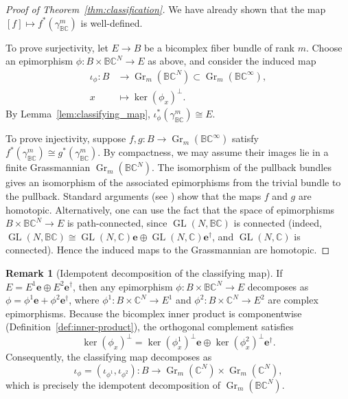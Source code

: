 \documentclass[11pt]{amsart}
\newcommand{\BC}{\mathbb{BC}}       %
\newcommand{\C}{\mathbb{C}}          %
\newcommand{\e}{\mathbf{e}}          %
\newcommand{\ed}{\mathbf{e}^\dagger} %
\newcommand{\GL}{\operatorname{GL}}  %
\newcommand{\Gr}{\operatorname{Gr}}
\theoremstyle{definition}
\newtheorem{remark}[prop]{Remark}            %
\begin{document}
\begin{proof}[Proof of Theorem~\ref{thm:classification}]
    We have already shown that the map $[f] \mapsto f^*(\gamma_{\BC}^m)$ is well-defined.

To prove surjectivity, let $E\to B$ be a bicomplex fiber bundle of rank $m$. Choose an
epimorphism $\phi:B\times\BC^N\to E$ as above, and consider the induced map
\begin{align*}
\iota_{\phi}:B&\to\Gr_m(\BC^{N})
\subset\Gr_m(\BC^{\infty}),\\
x&\mapsto\ker(\phi_{x})^{\perp}.
\end{align*}
By Lemma~\ref{lem:classifying_map}, $\iota_{\phi}^{*}(\gamma_{\mathbb{B}\mathbb{C}}^{m})\cong E$.

To prove injectivity, suppose $f, g: B \to \Gr_m(\BC^\infty)$ satisfy $f^*(\gamma_{\BC}^m) \cong g^*(\gamma_{\BC}^m)$. By compactness, we may assume their images lie in a finite Grassmannian $\Gr_m(\BC^N)$. The isomorphism of the pullback bundles gives an isomorphism of the associated epimorphisms from the trivial bundle to the pullback. Standard arguments (see \cite[Theorem~1.4.15]{Ati1967}) show that the maps $f$ and $g$ are homotopic. Alternatively, one can use the fact that the space of epimorphisms $B \times \BC^N \to E$ is path-connected, since $\GL(N,\BC)$ is connected (indeed, $\GL(N,\BC) \cong \GL(N,\C)\e \oplus \GL(N,\C)\ed$, and $\GL(N,\C)$ is connected). Hence the induced maps to the Grassmannian are homotopic.
\end{proof}

\begin{remark}[Idempotent decomposition of the classifying map]
If $E=E^{1}\e\oplus E^{2}\ed$, then any epimorphism
$\phi:B\times\BC^{N}\to E$ decomposes as
$\phi=\phi^{1}\e+\phi^{2}\ed$, where
$\phi^{1}:B\times\C^{N}\to E^{1}$ and
$\phi^{2}:B\times\C^{N}\to E^{2}$ are complex epimorphisms.
Because the bicomplex inner product is componentwise
(Definition~\textup{\ref{def:inner-product}}), the orthogonal complement
satisfies
\begin{equation*}
\ker(\phi_{x})^{\perp}
=\ker(\phi^{1}_{x})^{\perp}\mathbf{e}\oplus\ker(\phi^{2}_{x})^{\perp}\mathbf{e}^{\dagger}.
\end{equation*}
Consequently, the classifying map decomposes as
\begin{equation*}
\iota_{\phi}
=(\iota_{\phi^{1}},\iota_{\phi^{2}})
:B\to\operatorname{Gr}_{m}(\mathbb{C}^{N})\times\operatorname{Gr}_{m}(\mathbb{C}^{N}),
\end{equation*}
which is precisely the idempotent decomposition of\/
$\operatorname{Gr}_{m}(\mathbb{B}\mathbb{C}^{N})$.
\end{remark}
\end{document}
